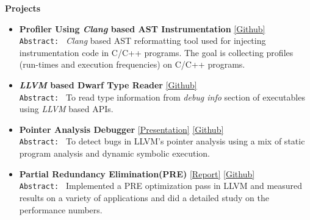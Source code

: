 \documentclass[9pt]{article}
\newenvironment{changemargin}[2]{%
  \begin{list}{}{%
    \setlength{\topsep}{0pt}%
    \setlength{\leftmargin}{#1}%
    \setlength{\rightmargin}{#2}%
    \setlength{\listparindent}{\parindent}%
    \setlength{\itemindent}{\parindent}%
    \setlength{\parsep}{\parskip}%
  }%
  \item[]}{\end{list}
}
\newenvironment{body} {
	\vspace*{-16pt}
	\begin{changemargin}{-0.25in}{-0.5in}
  }	
	{\end{changemargin}
}
\begin{document}
\begin{body}
	\vspace{14pt}
	\textbf{Projects}{} \hfill  \\
	\begin{itemize} \itemsep 3pt

           \item \textbf{Profiler Using \emph{Clang} based AST Instrumentation}
           \href{https://github.com/sdasgup3/profiler-using-clang-based-ast-instrumentation}{[Github]} \\ 
           \texttt{Abstract: } \emph{Clang} based AST reformatting tool used for
           injecting instrumentation code in C/C++ programs. The goal is
           collecting profiles (run-times and execution frequencies) on C/C++
           programs.

           \item \textbf{\emph{LLVM} based Dwarf Type Reader} 
           \href{https://github.com/sdasgup3/dwarf-type-reader}{[Github]} \\
             \texttt{Abstract: } To read type information from \emph{debug info}
             section of executables using \emph{LLVM} based APIs.

           \item \textbf{Pointer Analysis Debugger} 
             \href{https://www.dropbox.com/s/pm47zniafdydotw/pa_debugger.pdf?dl=0}{[Presentation]} 
           \href{https://github.com/sdasgup3/symbolic-analysis}{[Github]} \\
                                  \texttt{Abstract: } To detect bugs in LLVM's
                                  pointer analysis using a mix of static
                                  program analysis and dynamic symbolic
                                  execution. 

           \item \textbf{Partial Redundancy Elimination(PRE)} 
           \href{http://webhost.engr.illinois.edu/~sdasgup3/Document/report_cs526.pdf}{[Report]} 
           \href{https://github.com/sdasgup3/partial-redundancy-elimination}{[Github]} \\
                                  \texttt{Abstract: } Implemented a PRE
                                  optimization pass in LLVM and measured results
                                  on a variety of applications and did a detailed 
                                  study on the performance numbers. 


\end{itemize}
\end{body}
\end{document}
